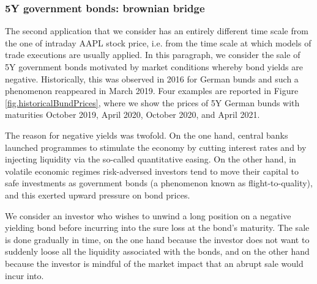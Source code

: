 \documentclass[10pt,a4paper]{article}
\begin{document}
	
	





	
	\subsubsection{5Y government bonds: brownian bridge}
	The second application that we consider has an entirely different time scale from the one of intraday AAPL stock price, i.e. from the time scale at which models of trade executions are usually applied. In this  paragraph, we consider the sale of 5Y government bonds motivated by market conditions whereby bond yields are negative. Historically, this was observed in 2016 for German bunds and such a phenomenon reappeared in March 2019. Four examples are reported in Figure \ref{fig.historicalBundPrices}, where we show the prices of 5Y German bunds with maturities October 2019, April 2020, October 2020, and April 2021.
	
	The reason for negative yields was twofold. On the one hand, central banks launched programmes to stimulate the economy by cutting interest rates and by injecting liquidity via the so-called quantitative easing. On the other hand, in volatile economic regimes risk-adversed investors tend to move their capital to safe investments as government bonds (a phenomenon known as flight-to-quality), and this exerted upward pressure on bond prices.  
	
	We consider an investor who wishes to unwind a long position on a negative yielding bond before incurring into the sure loss at the bond's maturity. The sale is done gradually in time, on the one hand because the investor does not want to suddenly loose all the liquidity associated with the bonds, and on the other hand because the investor is mindful of the market impact that an abrupt sale would incur into.  
	
	
	
\end{document}
